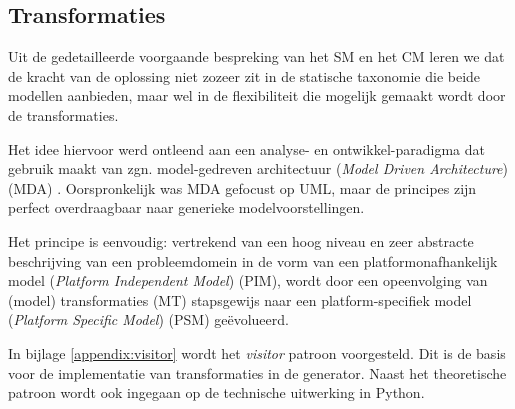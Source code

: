
\subsection{Transformaties}
\label{subsection:devel-transformations}

Uit de gedetailleerde voorgaande bespreking van het SM en het CM leren we dat
de kracht van de oplossing niet zozeer zit in de statische taxonomie die beide
modellen aanbieden, maar wel in de flexibiliteit die mogelijk gemaakt wordt
door de transformaties.

Het idee hiervoor werd ontleend aan een analyse- en ontwikkel-paradigma dat
gebruik maakt van zgn. model-gedreven architectuur (\emph{Model Driven
Architecture}) (MDA) \citep{soley2000model,kleppe2003mda}. Oorspronkelijk was
MDA gefocust op UML, maar de principes zijn perfect overdraagbaar naar
generieke modelvoorstellingen.

Het principe is eenvoudig: vertrekend van een hoog niveau en zeer abstracte
beschrijving van een probleemdomein in de vorm van een platformonafhankelijk
model (\emph{Platform Independent Model}) (PIM), wordt door een
opeenvolging van (model) transformaties (MT) stapsgewijs naar een
platform-specifiek model (\emph{Platform Specific Model}) (PSM)
ge\"evolueerd.

In bijlage \ref{appendix:visitor} wordt het \emph{visitor} patroon voorgesteld.
Dit is de basis voor de implementatie van transformaties in de generator. Naast
het theoretische patroon wordt ook ingegaan op de technische uitwerking in
Python.
